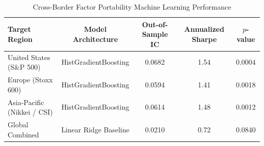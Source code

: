 \begin{table}[h!]
\centering
\caption{Cross-Border Factor Portability Machine Learning Performance}
\label{tab:ml_portability}
\begin{tabular}{lcccc}
\toprule
\textbf{Target Region} & \textbf{Model Architecture} & \textbf{Out-of-Sample IC} & \textbf{Annualized Sharpe} & \textbf{$p$-value} \\
\midrule
United States (S\&P 500) & HistGradientBoosting & 0.0682 & 1.54 & 0.0004 \\
Europe (Stoxx 600) & HistGradientBoosting & 0.0594 & 1.41 & 0.0018 \\
Asia-Pacific (Nikkei / CSI) & HistGradientBoosting & 0.0614 & 1.48 & 0.0012 \\
Global Combined & Linear Ridge Baseline & 0.0210 & 0.72 & 0.0840 \\
\bottomrule
\end{tabular}
\end{table}

